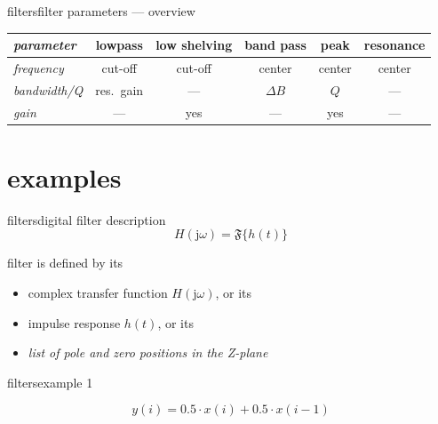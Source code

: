         \begin{frame}{filters}{filter parameters --- overview}
            \begin{footnotesize}
            \begin{table}%
            \begin{tabular}{l|ccccc}
                \textit{parameter} & \textbf{lowpass} & \textbf{low shelving} & \textbf{band pass} & \textbf{peak} & \textbf{resonance}\\ \hline
                \textit{frequency} &cut-off&cut-off&center&center&center\\
                \textit{bandwidth/Q} &res.\ gain&---&$\Delta B$& $Q$ &---\\
                \textit{gain} &---&yes&---&yes&---
            \end{tabular}
            \end{table}
            \end{footnotesize}
        \end{frame}
        
\section{examples}	
	\begin{frame}{filters}{digital filter description}
		\begin{equation*}
			H(\mathrm{j}\omega) = \mathfrak{F}\{h(t)\}
		\end{equation*}


		filter is defined by its
		\begin{itemize}
			\item	complex transfer function $H(\mathrm{j}\omega)$, or its
			\item	impulse response $h(t)$, or its
			\item<2->	\textit{list of pole and zero positions in the Z-plane}
		\end{itemize}
	\end{frame}

	
	\begin{frame}{filters}{example 1}

	        \begin{figure}
				\begin{center}
                
				\end{center}
	        \end{figure}
        
        	\pause
            \begin{equation*}
        		y(i) = 0.5\cdot x(i) + 0.5\cdot x(i-1)
        	\end{equation*}
	\end{frame}	
	
